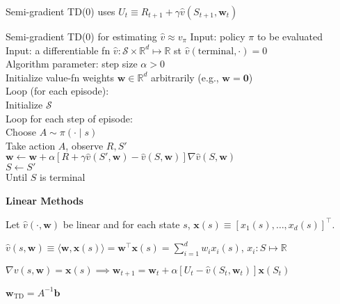 \documentclass[twocolumn]{article}
\begin{document}
Semi-gradient TD(0) uses $U_t \equiv R_{t+1} + \gamma \hat v (S_{t+1}, \mathbf w_t)$

\begin{mydef}{Semi-gradient TD(0) for estimating $\hat v \approx v_\pi$}{}
    Input: policy $\pi$ to be evaluated \\
    Input: a differentiable fn $\hat v: \mathcal S \times \mathbb R^d \mapsto \mathbb R$ st $\hat v(\text{terminal}, \cdot) = 0$\\
    Algorithm parameter: step size $\alpha > 0$ \\
    Initialize value-fn weights $\mathbf w \in \mathbb R^d$ arbitrarily (e.g., $\mathbf w = \mathbf 0$) \\
    Loop (for each episode): \\
        \hspace*{2em}Initialize $\mathcal S$ \\
        \hspace*{2em}Loop for each step of episode: \\
            \hspace*{4em}Choose $A \sim \pi(\cdot \mid s)$ \\
            \hspace*{4em}Take action $A$, observe $R, S'$ \\
            \hspace*{4em}$\mathbf w \leftarrow \mathbf w + \alpha[R + \gamma \hat{v}(S', \mathbf w) - \hat v(S, \mathbf w)] \nabla \hat v(S, \mathbf w)$ \\
            \hspace*{4em}$S \leftarrow S'$ \\
        \hspace*{2em}Until $S$ is terminal
\end{mydef}

\dotfill

\textbf{Linear Methods}

Let $\hat v(\cdot, \mathbf w)$ be linear and for each state $s$, $\mathbf x(s) \equiv [x_1(s), \dots, x_d(s)]^\top$.

$\hat v(s, \mathbf w) \equiv \langle \mathbf w, \mathbf x(s) \rangle = \mathbf w^\top \mathbf x(s) = \sum_{i=1}^d w_i x_i(s)$, \hfill $x_i: S \mapsto \mathbb R$

$\nabla v(s, \mathbf w) = \mathbf x(s) \implies \mathbf w_{t+1} = \mathbf w_t + \alpha[U_t - \hat v(S_t, \mathbf w_t)] \mathbf x(S_t)$

$\mathbf w_{\text{TD}} = A^{-1} \mathbf b$
\end{document}
